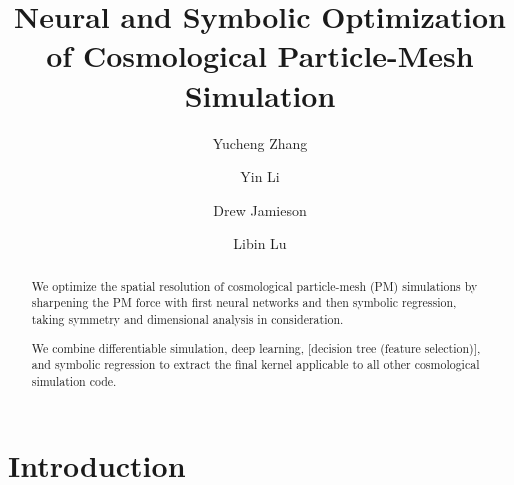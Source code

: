 \documentclass[modern, trackchanges, dvipsnames]{aastex631}
\begin{document}
\title{\large Neural and Symbolic Optimization of Cosmological
Particle-Mesh Simulation
\vspace{0.3em}}


\author[0000-0002-9300-2632]{\normalsize Yucheng Zhang}

\author[0000-0002-0701-1410]{\normalsize Yin Li}

\author[0000-0001-5044-7204]{\normalsize Drew Jamieson}

\author[0000-0003-0745-9431]{\normalsize Libin Lu}







\begin{abstract}

We optimize the spatial resolution of cosmological particle-mesh (PM)
simulations by sharpening the PM force with first neural networks and
then symbolic regression, taking symmetry and dimensional analysis in
consideration.

We combine differentiable simulation, deep learning, [decision tree
(feature selection)], and symbolic regression to extract the final
kernel applicable to all other cosmological simulation code.

\end{abstract}


\vspace{1em}
\section{Introduction}
\end{document}
